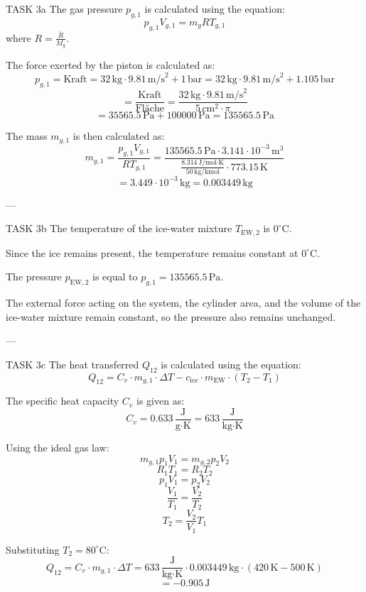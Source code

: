 TASK 3a  
The gas pressure \( p_{g,1} \) is calculated using the equation:  
\[
p_{g,1} V_{g,1} = m_g R T_{g,1}
\]  
where \( R = \frac{\bar{R}}{M_g} \).  

The force exerted by the piston is calculated as:  
\[
p_{g,1} = \text{Kraft} = 32 \, \text{kg} \cdot 9.81 \, \text{m/s}^2 + 1 \, \text{bar} = 32 \, \text{kg} \cdot 9.81 \, \text{m/s}^2 + 1.105 \, \text{bar}
\]  
\[
= \frac{\text{Kraft}}{\text{Fläche}} = \frac{32 \, \text{kg} \cdot 9.81 \, \text{m/s}^2}{5 \, \text{cm}^2 \cdot \pi}
\]  
\[
= 35565.5 \, \text{Pa} + 100000 \, \text{Pa} = 135565.5 \, \text{Pa}
\]  

The mass \( m_{g,1} \) is then calculated as:  
\[
m_{g,1} = \frac{p_{g,1} V_{g,1}}{R T_{g,1}} = \frac{135565.5 \, \text{Pa} \cdot 3.141 \cdot 10^{-3} \, \text{m}^3}{\frac{8.314 \, \text{J/mol·K}}{50 \, \text{kg/kmol}} \cdot 773.15 \, \text{K}}
\]  
\[
= 3.449 \cdot 10^{-3} \, \text{kg} = 0.003449 \, \text{kg}
\]  

---

TASK 3b  
The temperature of the ice-water mixture \( T_{\text{EW},2} \) is \( 0^\circ\text{C} \).  

Since the ice remains present, the temperature remains constant at \( 0^\circ\text{C} \).  

The pressure \( p_{\text{EW},2} \) is equal to \( p_{g,1} = 135565.5 \, \text{Pa} \).  

The external force acting on the system, the cylinder area, and the volume of the ice-water mixture remain constant, so the pressure also remains unchanged.  

---

TASK 3c  
The heat transferred \( Q_{12} \) is calculated using the equation:  
\[
Q_{12} = C_v \cdot m_{g,1} \cdot \Delta T - c_{\text{ice}} \cdot m_{\text{EW}} \cdot (T_2 - T_1)
\]  

The specific heat capacity \( C_v \) is given as:  
\[
C_v = 0.633 \, \frac{\text{J}}{\text{g·K}} = 633 \, \frac{\text{J}}{\text{kg·K}}
\]  

Using the ideal gas law:  
\[
m_{g,1} p_1 V_1 = m_{g,2} p_2 V_2
\]  
\[
R_1 T_1 = R_2 T_2
\]  
\[
p_1 V_1 = p_2 V_2
\]  
\[
\frac{V_1}{T_1} = \frac{V_2}{T_2}
\]  
\[
T_2 = \frac{V_2}{V_1} T_1
\]  

Substituting \( T_2 = 80^\circ\text{C} \):  
\[
Q_{12} = C_v \cdot m_{g,1} \cdot \Delta T = 633 \, \frac{\text{J}}{\text{kg·K}} \cdot 0.003449 \, \text{kg} \cdot (420 \, \text{K} - 500 \, \text{K})
\]  
\[
= -0.905 \, \text{J}
\]